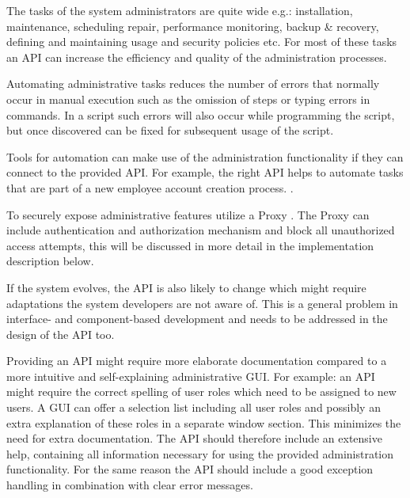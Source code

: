 The tasks of the system administrators are quite wide e.g.: installation, maintenance, scheduling repair, performance monitoring, backup \& recovery, defining and maintaining usage and security policies etc. For most of these tasks an API can increase the efficiency and quality of the administration processes. 

Automating administrative tasks reduces the number of errors that normally occur in manual execution such as the omission of steps or typing errors in commands. In a script such errors will also occur while programming the script, but once discovered can be fixed for subsequent usage of the script.

Tools for automation can make use of the administration functionality if they can connect to the provided API. For example, the right API helps to automate tasks that are part of a new employee account creation process. \cite{Limoncelli2011a}.

To securely expose administrative features utilize a {\sc Proxy} \cite{Buschmann1996}. The {\sc Proxy} can include authentication and authorization mechanism and block all unauthorized access attempts, this will be discussed in more detail in the implementation description below.

If the system evolves, the API is also likely to change which might require adaptations the system developers are not aware of. This is a general problem in interface- and component-based development and needs to be addressed in the design of the API too. 

Providing an API might require more elaborate documentation compared to a more intuitive and self-explaining administrative GUI. 
For example: an API might require the correct spelling
of user roles which need to be assigned to new users. A GUI can offer a selection list including all user roles and possibly an extra explanation of these roles in a separate window section. %
This minimizes the need for extra documentation. The API should therefore include an extensive help, containing all information necessary for using the provided administration functionality. For the same reason the API should include a good exception handling in combination with clear error messages. \\


